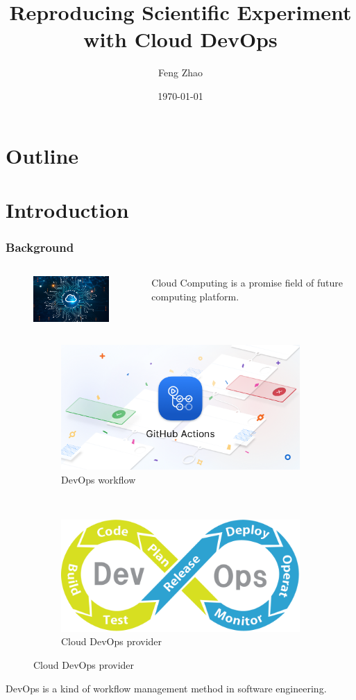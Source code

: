 \documentclass[notheorems]{beamer}
\title{Reproducing Scientific Experiment with Cloud DevOps}
\author{Feng Zhao}
\date{\today}
\begin{document}
\begin{frame}
	\titlepage
\end{frame}
\section*{Outline}
\begin{frame}
	\tableofcontents
\end{frame}

\section{Introduction}
\begin{frame}
\frametitle{Background}
	\begin{columns}
		\column{5cm}
		\begin{figure}
			\includegraphics[width=4cm]{pic/cloud_computing.png}
		\end{figure}
		\column{5cm}
	Cloud Computing is 	a promise field of future computing platform.
		\end{columns}
\begin{figure}
	\centering
	\begin{subfigure}{0.4\textwidth}
		\includegraphics[width=\textwidth]{pic/github_actions.png}
		\caption{DevOps workflow}
	\end{subfigure}~~~~~
	\begin{subfigure}{0.4\textwidth}
		\includegraphics[width=\textwidth]{pic/general_workflow.png}
		\caption{Cloud DevOps provider}
	\end{subfigure}
\end{figure}
DevOps is a kind of workflow management method in software engineering.
\end{frame}
\end{document}
